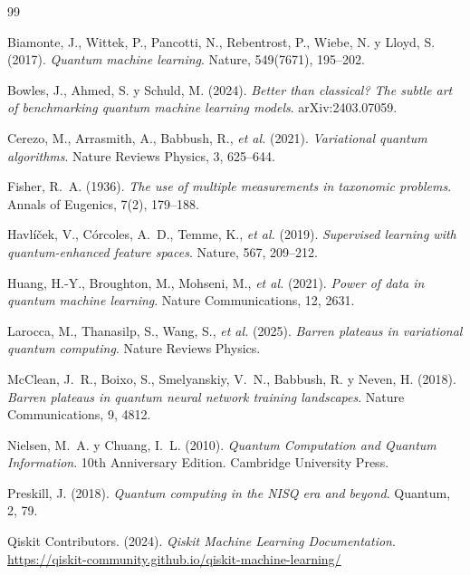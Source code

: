 \documentclass[a4paper,10pt,twocolumn]{article}
\begin{document}
\begin{thebibliography}{99}
\small

Biamonte, J., Wittek, P., Pancotti, N., Rebentrost, P., Wiebe, N. y
Lloyd, S. (2017).
\textit{Quantum machine learning}.
Nature, 549(7671), 195--202.

Bowles, J., Ahmed, S. y Schuld, M. (2024).
\textit{Better than classical? The subtle art of benchmarking quantum
machine learning models}. arXiv:2403.07059.

Cerezo, M., Arrasmith, A., Babbush, R., \emph{et al.} (2021).
\textit{Variational quantum algorithms}.
Nature Reviews Physics, 3, 625--644.

Fisher, R.~A. (1936).
\textit{The use of multiple measurements in taxonomic problems}.
Annals of Eugenics, 7(2), 179--188.

Havl\'i\v{c}ek, V., C\'orcoles, A.~D., Temme, K., \emph{et al.} (2019).
\textit{Supervised learning with quantum-enhanced feature spaces}.
Nature, 567, 209--212.

Huang, H.-Y., Broughton, M., Mohseni, M., \emph{et al.} (2021).
\textit{Power of data in quantum machine learning}.
Nature Communications, 12, 2631.

Larocca, M., Thanasilp, S., Wang, S., \emph{et al.} (2025).
\textit{Barren plateaus in variational quantum computing}.
Nature Reviews Physics.

McClean, J.~R., Boixo, S., Smelyanskiy, V.~N., Babbush, R. y Neven, H.
(2018).
\textit{Barren plateaus in quantum neural network training landscapes}.
Nature Communications, 9, 4812.

Nielsen, M.~A. y Chuang, I.~L. (2010).
\textit{Quantum Computation and Quantum Information}.
10th Anniversary Edition. Cambridge University Press.

Preskill, J. (2018).
\textit{Quantum computing in the NISQ era and beyond}.
Quantum, 2, 79.

Qiskit Contributors. (2024).
\textit{Qiskit Machine Learning Documentation}.
\url{https://qiskit-community.github.io/qiskit-machine-learning/}


\end{thebibliography}
\end{document}
